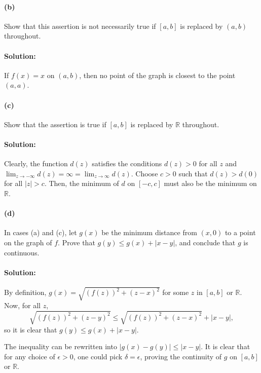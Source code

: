 \documentclass{article}
\begin{document}
\paragraph{(b)} Show that this assertion is not necessarily true if $[a, b]$
is replaced by $(a, b)$ throughout.

\paragraph{Solution:} If $f(x) = x$ on $(a, b)$, then no point of the graph is
closest to the point $(a, a)$.

\paragraph{(c)} Show that the assertion is true if $[a, b]$ is replaced by
$\mathbb{R}$ throughout.

\paragraph{Solution:} Clearly, the function $d(z)$ satisfies the conditions
$d(z) > 0$ for all $z$ and $\lim_{z \rightarrow -\infty}d(z) = \infty = \lim_{z
\rightarrow \infty}d(z)$. Choose $c > 0$ such that $d(z) > d(0)$ for all $|z| >
c$. Then, the minimum of $d$ on $[-c, c]$ must also be the minimum on
$\mathbb{R}$.

\paragraph{(d)} In cases (a) and (c), let $g(x)$ be the minimum distance from
$(x, 0)$ to a point on the graph of $f$. Prove that $g(y) \leq g(x) + |x - y|$,
and conclude that $g$ is continuous.

\paragraph{Solution:} By definition, $g(x) = \sqrt{(f(z))^2 + (z - x)^2}$ for
some $z$ in $[a, b]$ or $\mathbb{R}$. Now, for all $z$, \begin{equation*}
  \sqrt{(f(z))^2 + (z - y)^2} \leq \sqrt{(f(z))^2 + (z - x)^2} + |x - y|,
\end{equation*} so it is clear that $g(y) \leq g(x) + |x - y|$.

The inequality can be rewritten into $|g(x) - g(y)| \leq |x - y|$. It is clear
that for any choice of $\epsilon > 0$, one could pick $\delta = \epsilon$,
proving the continuity of $g$ on $[a, b]$ or $\mathbb{R}$.
\end{document}
